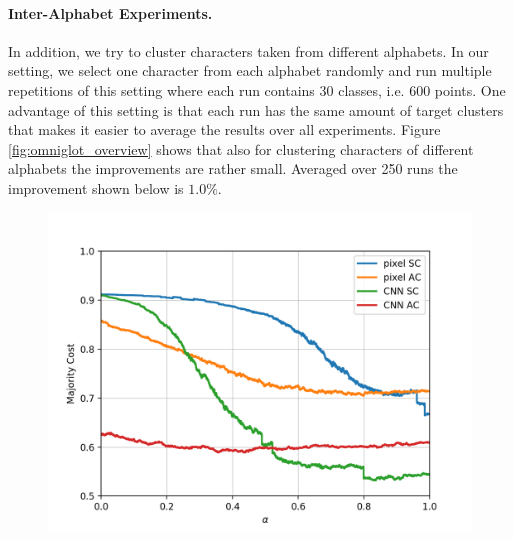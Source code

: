 \paragraph{Inter-Alphabet Experiments.} In addition, we try to cluster characters taken from different alphabets. In our setting, we select one character from each alphabet randomly and run multiple repetitions of this setting where each run contains 30 classes, i.e. 600 points. One advantage of this setting is that each run has the same amount of target clusters that makes it easier to average the results over all experiments. Figure \ref{fig:omniglot_overview} shows that also for clustering characters of different alphabets the improvements are rather small. Averaged over 250 runs the improvement shown below is $1.0\%$.

\begin{figure}[H]
  \centering
  \begin{minipage}{.45\textwidth}
  \centering
  {\includegraphics[width=\linewidth]{plots/omniglot_all}}
\end{minipage}\quad
\begin{minipage}{.45\textwidth}
  \centering

\end{minipage}
\end{figure}
